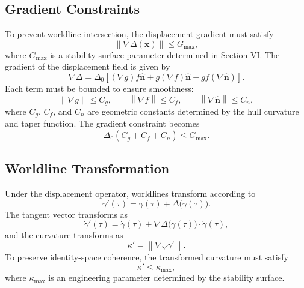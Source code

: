 \documentclass[aip,adv,reprint,floatfix]{revtex4-2}
\begin{document}
\subsection{Gradient Constraints}

To prevent worldline intersection, the displacement gradient must satisfy
\begin{equation}
\left\| \nabla \Delta(\mathbf{x}) \right\| \leq G_{\max},
\end{equation}
where $G_{\max}$ is a stability-surface parameter determined in Section VI. The gradient of the displacement field is given by
\begin{equation}
\nabla \Delta = 
\Delta_0 \left[
(\nabla g) f \hat{\mathbf{n}}
+
g (\nabla f) \hat{\mathbf{n}}
+
g f (\nabla \hat{\mathbf{n}})
\right].
\end{equation}
Each term must be bounded to ensure smoothness:
\begin{equation}
\left\| \nabla g \right\| \leq C_g,
\qquad
\left\| \nabla f \right\| \leq C_f,
\qquad
\left\| \nabla \hat{\mathbf{n}} \right\| \leq C_n,
\end{equation}
where $C_g$, $C_f$, and $C_n$ are geometric constants determined by the hull curvature and taper function. The gradient constraint becomes
\begin{equation}
\Delta_0 \left( C_g + C_f + C_n \right) \leq G_{\max}.
\end{equation}

\subsection{Worldline Transformation}

Under the displacement operator, worldlines transform according to
\begin{equation}
\gamma'(\tau) = \gamma(\tau) + \Delta\big(\gamma(\tau)\big).
\end{equation}
The tangent vector transforms as
\begin{equation}
\dot{\gamma}'(\tau) = \dot{\gamma}(\tau) + \nabla \Delta\big(\gamma(\tau)\big) \cdot \dot{\gamma}(\tau),
\end{equation}
and the curvature transforms as
\begin{equation}
\kappa' = 
\left\|
\nabla_{\dot{\gamma}'} \dot{\gamma}'
\right\|.
\end{equation}
To preserve identity-space coherence, the transformed curvature must satisfy
\begin{equation}
\kappa' \leq \kappa_{\max},
\end{equation}
where $\kappa_{\max}$ is an engineering parameter determined by the stability surface.
\end{document}
